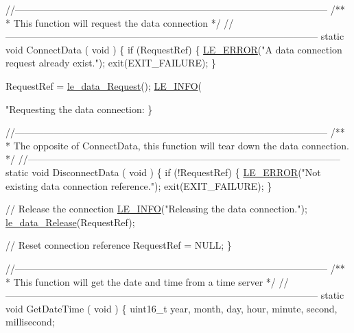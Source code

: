\begin{DoxyCodeInclude}
{{{\textcolor{comment}{//--------------------------------------------------------------------------------------------------}\textcolor{comment}{}
\textcolor{comment}{/**}
\textcolor{comment}{ *  This function will request the data connection}
\textcolor{comment}{ */}
\textcolor{comment}{//--------------------------------------------------------------------------------------------------}
\textcolor{keyword}{static} \textcolor{keywordtype}{void} ConnectData
(
    \textcolor{keywordtype}{void}
)
\{
    \textcolor{keywordflow}{if} (RequestRef)
    \{
        \hyperlink{le__log_8h_a353590f91b3143a7ba3a416ae5a50c3d}{LE\_ERROR}(\textcolor{stringliteral}{"A data connection request already exist."});
        exit(EXIT\_FAILURE);
    \}

    RequestRef = \hyperlink{le__data__interface_8h_afb9db0acdd98620cb0cd303bee8a817c}{le\_data\_Request}();
    \hyperlink{le__log_8h_a23e6d206faa64f612045d688cdde5808}{LE\_INFO}(\textcolor{stringliteral}{"Requesting the data connection: %
\}

\textcolor{comment}{//--------------------------------------------------------------------------------------------------}\textcolor{comment}{}
\textcolor{comment}{/**}
\textcolor{comment}{ *  The opposite of ConnectData, this function will tear down the data connection.}
\textcolor{comment}{ */}
\textcolor{comment}{//--------------------------------------------------------------------------------------------------}
\textcolor{keyword}{static} \textcolor{keywordtype}{void} DisconnectData
(
    \textcolor{keywordtype}{void}
)
\{
    \textcolor{keywordflow}{if} (!RequestRef)
    \{
        \hyperlink{le__log_8h_a353590f91b3143a7ba3a416ae5a50c3d}{LE\_ERROR}(\textcolor{stringliteral}{"Not existing data connection reference."});
        exit(EXIT\_FAILURE);
    \}

    \textcolor{comment}{// Release the connection}
    \hyperlink{le__log_8h_a23e6d206faa64f612045d688cdde5808}{LE\_INFO}(\textcolor{stringliteral}{"Releasing the data connection."});
    \hyperlink{le__data__interface_8h_a1dc7cd8faed6b1ee02ea947cf02b8ee7}{le\_data\_Release}(RequestRef);

    \textcolor{comment}{// Reset connection reference}
    RequestRef = NULL;
\}

\textcolor{comment}{//--------------------------------------------------------------------------------------------------}\textcolor{comment}{}
\textcolor{comment}{/**}
\textcolor{comment}{ *  This function will get the date and time from a time server}
\textcolor{comment}{ */}
\textcolor{comment}{//--------------------------------------------------------------------------------------------------}
\textcolor{keyword}{static} \textcolor{keywordtype}{void} GetDateTime
(
    \textcolor{keywordtype}{void}
)
\{
    uint16\_t year, month, day, hour, minute, second, millisecond;

}}}}
\end{DoxyCodeInclude}
